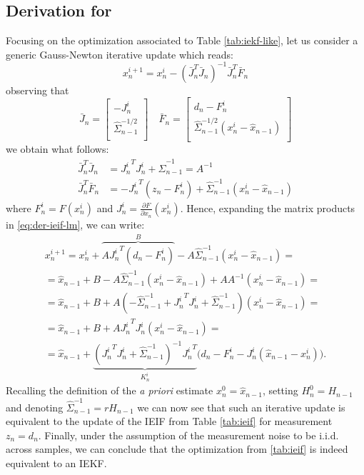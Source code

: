 \subsection{Derivation for }
\label{app:ieif-lm}
%
Focusing on the optimization associated to Table \ref{tab:iekf-like}, let us consider a generic Gauss-Newton iterative update which reads:
% 
\begin{equation}
\label{eq:der-ieif-lm}
    x_n^{i + 1}= x_n^{i} - (\bar{J}_n^T \bar{J}_n)^{-1} \bar{J}_n^T \bar{F}_n 
\end{equation}
observing that
\begin{equation}
\bar{J}_n = \left[
 \begin{array}{c}
 	- J_n^i \\
\hat{\Sigma}_{n-1}^{-1/2} \\
 \end{array}
 \right]
\quad
\bar{F}_n = \left[
 \begin{array}{c}
 d_n - F_n^i \\
\hat{\Sigma}_{n-1}^{-1/2} (x_n^i - \hat{x}_{n - 1}) \\
 \end{array}
 \right]   
\end{equation}
we obtain what follows:
\begin{align*}
\bar{J}_n^T \bar{J}_n &= {J_n^i}^T J_n^i +\hat{\Sigma}_{n-1}^{-1} = A^{-1} \\
\bar{J}_n^T \bar{F}_n  &=  	- {J_n^i}^T(z_n - F_n^i) + \hat{\Sigma}_{n-1}^{-1}(x_n^i - \hat{x}_{n - 1})
 \end{align*}
where  $F_n^i = F(x_n^i)$ and $J_n^i = \frac{\partial F}{\partial x_n}(x_n^i)$.
Hence, expanding the matrix products in \eqref{eq:der-ieif-lm}, we can write:
 \begin{align*}
x_n^{i + 1} 
= x_n^i +\overbrace{A {J_n^i}^T(d_n - F_n^i)}^B - A \hat{\Sigma}_{n-1}^{-1}(x_n^i - \hat{x}_{n - 1})  = \\
= \hat{x}_{n - 1} + B  - A \hat{\Sigma}_{n-1}^{-1}(x_n^i - \hat{x}_{n - 1}) + A A^{-1}( x_n^i - \hat{x}_{n - 1}) = \\
= \hat{x}_{n - 1} + B + A(- \hat{\Sigma}_{n-1}^{-1} + {J_n^i}^T J_n^i + \hat{\Sigma}_{n-1}^{-1})(x_n^i - \hat{x}_{n - 1}) = \\
= \hat{x}_{n - 1} + B + A {J_n^i}^T J_n^i (x_n^i - \hat{x}_{n - 1}) = \\
= \hat{x}_{n - 1} + \underbrace{\left({J_n^i}^T J_n^i + \hat{\Sigma}_{n-1}^{-1}\right)^{-1} {J_n^i}^T}_{K_n^i}  \big(d_n - F_n^i - J_n^i (\hat{x}_{n - 1} - x_n^i)\big).
\end{align*}
% 
Recalling the definition of the \textit{a priori} estimate $x_n^0 = \hat{x}_{n - 1}$, setting $H_n^0 = H_{n-1}$ and denoting $\hat{\Sigma}_{n-1}^{-1} = r H_{n - 1}$ we can now see that such an iterative update is equivalent to the update of the IEIF from Table \ref{tab:ieif} for measurement $z_n = d_n$. Finally, under  the assumption of the measurement noise to be i.i.d. across samples, we can conclude that the optimization from \ref{tab:ieif} is indeed equivalent to an IEKF.


% 